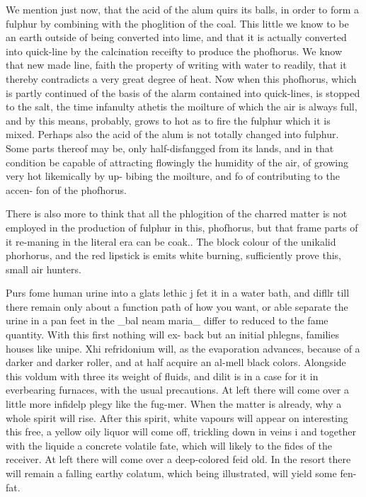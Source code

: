 We mention just now, that the acid of the alum quirs its balls, in order to form a fulphur by combining with the phoglition of the coal. This little we know to be an earth outside of being converted into lime, and that it is actually converted into quick-line by the calcination receifty to produce the phofhorus. We know that new made line, faith the property of writing with water to readily, that it thereby contradicts a very great degree of heat. Now when this phofhorus, which is partly continued of the basis of the alarm contained into quick-lines, is stopped to the salt, the time infanulty athetis the moilture of which the air is always full, and by this means, probably, grows to hot as to fire the fulphur which it is mixed. Perhaps also the acid of the alum is not totally changed into fulphur. Some parts thereof may be, only half-disfangged from its lands, and in that condition be capable of attracting flowingly the humidity of the air, of growing very hot likemically by up- bibing the moilture, and fo of contributing to the accen- fon of the phofhorus.\par\medskip
There is also more to think that all the phlogition of the charred matter is not employed in the production of fulphur in this, phofhorus, but that frame parts of it re-maning in the literal era can be coak.. The block colour of the unikalid phorhorus, and the red lipstick is emits white burning, sufficiently prove this, small air hunters.\par\medskip
Purs fome human urine into a glats lethic j fet it in a water bath, and difllr till there remain only about a function path of how you want, or able separate the urine in a pan feet in the \_bal neam maria\_ differ to reduced to the fame quantity. With this first nothing will ex- back but an initial phlegns, families houses like unipe. Xhi refridonium will, as the evaporation advances, because of a darker and darker roller, and at half acquire an al-mell black colors. Alongside this voldum with three its weight of fluids, and dilit is in a case for it in everbearing furnaces, with the usual precautions. At left there will come over a little more infidelp plegy like the fug-mer. When the matter is already, why a whole spirit will rise. After this spirit, white vapours will appear on interesting this free, a yellow oily liquor will come off, trickling down in veins i and together with the liquide a concrete volatile fate, which will likely to the fides of the receiver. At left there will come over a deep-colored feid old. In the resort there will remain a falling earthy colatum, which being illustrated, will yield some fen-fat.\par\medskip
